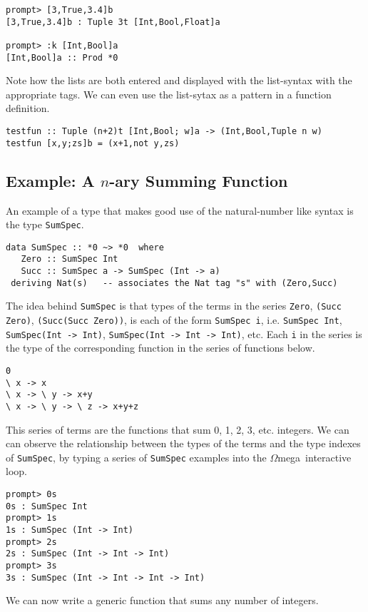 \documentclass[11pt,twoside]{article}
\newcommand{\om}{$\Omega$mega}
\begin{document}
\begin{verbatim}
prompt> [3,True,3.4]b
[3,True,3.4]b : Tuple 3t [Int,Bool,Float]a

prompt> :k [Int,Bool]a
[Int,Bool]a :: Prod *0 
\end{verbatim} 

Note how the lists are both entered and displayed with
the list-syntax with the appropriate tags. We can even use the list-sytax
as a pattern in a function definition.

\begin{verbatim}
testfun :: Tuple (n+2)t [Int,Bool; w]a -> (Int,Bool,Tuple n w)
testfun [x,y;zs]b = (x+1,not y,zs) 
\end{verbatim} 

\subsection{Example: A $n$-ary Summing Function}

An example of a type that makes good
use of the natural-number like syntax is the type {\tt SumSpec}.

\begin{verbatim}
data SumSpec :: *0 ~> *0  where
   Zero :: SumSpec Int 
   Succ :: SumSpec a -> SumSpec (Int -> a)
 deriving Nat(s)   -- associates the Nat tag "s" with (Zero,Succ)
\end{verbatim} 
The idea behind {\tt SumSpec} is that types of the
terms in the series {\tt Zero},
{\tt (Succ Zero)}, {\tt (Succ(Succ Zero))}, is each
of the form {\tt SumSpec i}, i.e. {\tt SumSpec Int}, {\tt SumSpec(Int -> Int)},
{\tt SumSpec(Int -> Int -> Int)}, etc. Each {\tt i} in the series
is the type of the corresponding function in the series of functions below.
\begin{verbatim}
0
\ x -> x
\ x -> \ y -> x+y
\ x -> \ y -> \ z -> x+y+z
\end{verbatim}
This series of terms are the functions that sum 0, 1, 2, 3, etc. integers.
We can can observe the relationship between the types of the terms and
the type indexes of {\tt SumSpec}, by typing a series of {\tt SumSpec} examples into the \om\ interactive loop.
\begin{verbatim}
prompt> 0s
0s : SumSpec Int
prompt> 1s
1s : SumSpec (Int -> Int)
prompt> 2s
2s : SumSpec (Int -> Int -> Int)
prompt> 3s
3s : SumSpec (Int -> Int -> Int -> Int)
\end{verbatim}
We can now write a generic function that sums any number of integers.
\end{document}
